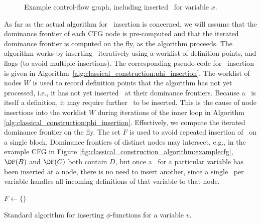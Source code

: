 {\begin{figure}
\caption{\label{fig:classical_construction_algorithm:examplecfg_varx}Example control-flow graph, including
inserted \phifuns\ for variable $x$.
}
\end{figure}



As far as the actual algorithm for \phifuns\ insertion
is concerned, we will assume that the dominance
frontier of each CFG node is pre-computed and that the iterated dominance 
frontier is computed on the fly, as the algorithm proceeds.
The algorithm works by inserting \phifuns\ iteratively
using a worklist of definition points, and flags (to avoid multiple
insertions). The corresponding pseudo-code for
\phifun\ insertion is given in
Algorithm~\ref{alg:classical_construction:phi_insertion}.
%
The worklist of nodes $W$ is used to record definition points that the
algorithm
has not yet processed, i.e., it has not yet inserted \phifuns\ at their dominance
frontiers.
Because a \phifun\ is itself a 
definition, it may require further \phifuns\ to be inserted.
This is the cause of node insertions into the worklist $W$ during
iterations of the inner loop in Algorithm 
\ref{alg:classical_construction:phi_insertion}.
Effectively, we compute the iterated dominance frontier on the fly.
%
The set $F$ is used to avoid repeated insertion of \phifuns\
on a single block. Dominance
frontiers
of distinct nodes may intersect, e.g., in the example CFG in Figure
\ref{fig:classical_construction_algorithm:examplecfg},
$\DF(B)$ and $\DF(C)$ both contain $D$, but
once a \phifun\ for a particular variable has been
inserted at a node,
there is no need to insert another, since a single \phifun\ per
variable handles all incoming definitions of that variable to that node.


\begin{algorithm}[h]
  $F \leftarrow \{ \}$
\caption{\label{alg:classical_construction:phi_insertion}Standard algorithm for 
inserting $\phi$-functions for  a variable $v$.}
\end{algorithm}

}
